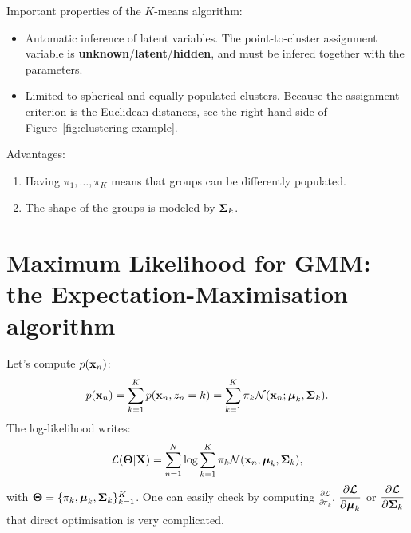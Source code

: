 Important properties of the $K$-means algorithm:
\begin{itemize}
 \item Automatic inference of latent variables. The point-to-cluster assignment variable is \textbf{unknown}/\textbf{latent}/\textbf{hidden}, and must be infered together with the parameters.
 \item Limited to spherical and equally populated clusters. Because the assignment criterion is the Euclidean distances, see the right hand side of Figure~\ref{fig:clustering-example}.
\end{itemize}



Advantages:
\begin{enumerate}
\item Having $\pi_1,\ldots,\pi_K$ means that groups can be differently populated.
\item The shape of the groups is modeled by $\boldsymbol{\mathbf{\Sigma}}_k$.
\end{enumerate}

\section{Maximum Likelihood for GMM: the Expectation-Maximisation algorithm}
 Let's compute $p(\boldsymbol{\mathbf{x}}_n)$:
 \begin{equation} p(\boldsymbol{\mathbf{x}}_n) = \sum_{k=1}^K p(\boldsymbol{\mathbf{x}}_n,z_n=k) = \sum_{k=1}^K \pi_k\mathcal{N}(\boldsymbol{\mathbf{x}}_n;\boldsymbol{\mathbf{\mu}}_k,\boldsymbol{\mathbf{\Sigma}}_k).\end{equation}
 The log-likelihood writes:
 \begin{equation}\mathcal{L}(\boldsymbol{\mathbf{\Theta}}|\boldsymbol{\mathbf{X}}) = \sum_{n=1}^N \log  \sum_{k=1}^K \pi_k\mathcal{N}(\boldsymbol{\mathbf{x}}_n;\boldsymbol{\mathbf{\mu}}_k,\boldsymbol{\mathbf{\Sigma}}_k),\end{equation}
 with $\boldsymbol{\mathbf{\Theta}}=\{\pi_k,\boldsymbol{\mathbf{\mu}}_k,\boldsymbol{\mathbf{\Sigma}}_k\}_{k=1}^K$. One can easily check by computing $\displaystyle\frac{\partial\mathcal{L}}{\partial\pi_k}$, $\displaystyle\frac{\partial\mathcal{L}}{\partial\boldsymbol{\mathbf{\mu}}_k}$ or $\displaystyle\frac{\partial\mathcal{L}}{\partial\boldsymbol{\mathbf{\Sigma}}_k}$ that direct optimisation is very complicated.\vspace{3mm}

